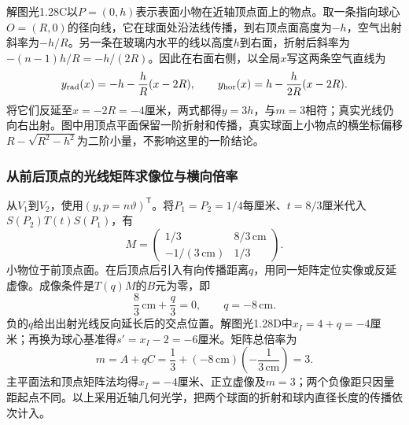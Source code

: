 \documentclass[UTF8,fontset=fandol,a4paper,11pt]{ctexart}
\newcommand{\figcaption}[1]{\par\vspace{2pt}{\small\color{muted}#1}\par}
\begin{document}
解图光1.28C以$P=(0,h)$表示表面小物在近轴顶点面上的物点。取一条指向球心$O=(R,0)$的径向线，它在球面处沿法线传播，到右顶点面高度为$-h$，空气出射斜率为$-h/R$。另一条在玻璃内水平的线以高度$h$到右面，折射后斜率为$-(n-1)h/R=-h/(2R)$。因此在右面右侧，以全局$x$写这两条空气直线为
\[
y_{\rm rad}(x)=-h-\frac hR(x-2R),
\qquad
y_{\rm hor}(x)=h-\frac{h}{2R}(x-2R).
\]
将它们反延至$x=-2R=-4$厘米，两式都得$y=3h$，与$m=3$相符；真实光线仍向右出射。图中用顶点平面保留一阶折射和传播，真实球面上小物点的横坐标偏移$R-\sqrt{R^2-h^2}$为二阶小量，不影响这里的一阶结论。
\begin{center}\begin{minipage}{.97\linewidth}\centering
{}
\figcaption{解图光1.28D\quad 球心像距、后顶点像距及全局像坐标}
\end{minipage}\end{center}

\subsubsection*{从前后顶点的光线矩阵求像位与横向倍率}
从$V_1$到$V_2$，使用$(y,p=n\vartheta)^{\mathsf T}$。将$P_1=P_2=1/4$每厘米、$t=8/3$厘米代入$S(P_2)T(t)S(P_1)$，有
\[
M=\begin{pmatrix}1/3&8/3\,\mathrm{cm}\\
-1/(3\,\mathrm{cm})&1/3\end{pmatrix}.
\]
小物位于前顶点面。在后顶点后引入有向传播距离$q$，用同一矩阵定位实像或反延虚像。成像条件是$T(q)M$的$B$元为零，即
\[
\frac83\,\mathrm{cm}+\frac q3=0,
\qquad q=-8\,\mathrm{cm}.
\]
负的$q$给出出射光线反向延长后的交点位置。解图光1.28D中$x_I=4+q=-4$厘米；再换为球心基准得$s'=x_I-2=-6$厘米。矩阵总倍率为
\[
m=A+qC
=\frac13+(-8\,\mathrm{cm})\left(-\frac1{3\,\mathrm{cm}}\right)
=3.
\]
主平面法和顶点矩阵法均得$x_I=-4$厘米、正立虚像及$m=3$；两个负像距只因量距起点不同。以上采用近轴几何光学，把两个球面的折射和球内直径长度的传播依次计入。
\end{document}
